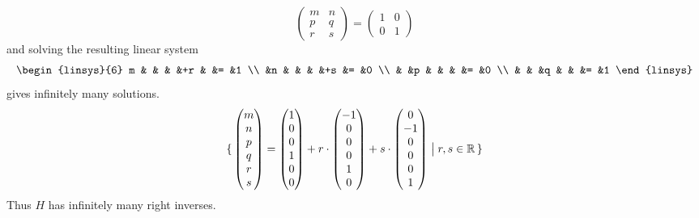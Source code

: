 \begin{exercises}
\begin{answer}
\begin{equation*}
          \begin{pmatrix}
             m  &n  \\
             p  &q  \\
             r  &s
          \end{pmatrix}
        =
          \begin{pmatrix}
             1  &0  \\
             0  &1
          \end{pmatrix}
      \end{equation*}
      and solving the resulting linear system
      \begin{equation*}
        \begin{linsys}{6}
           m  &   &   &   &+r &   &=    &1  \\
              &n  &   &   &   &+s &=    &0  \\
              &   &p  &   &   &   &=    &0  \\
              &   &   &q  &   &   &=    &1
         \end{linsys}
      \end{equation*}
      gives infinitely many solutions.
      \begin{equation*}
        \mbox{$\{\,\begin{pmatrix} m \\ n \\ p \\ q \\ r \\ s \end{pmatrix}
              =\begin{pmatrix} 1 \\ 0 \\ 0 \\ 1 \\ 0 \\ 0 \end{pmatrix}
              +r\cdot \begin{pmatrix} -1 \\ 0 \\ 0 \\ 0 \\ 1 \\ 0 \end{pmatrix}
              +s\cdot \begin{pmatrix} 0 \\ -1 \\ 0 \\ 0 \\ 0 \\ 1 \end{pmatrix}
             \bigm| r,s\in\mathbb{R}\,\}$}
      \end{equation*}
      Thus $H$ has infinitely many right inverses.


\end{answer}
\end{exercises}
